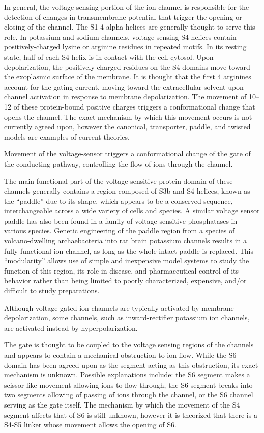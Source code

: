 In general, the voltage sensing portion of the ion channel is responsible for the detection of changes in transmembrane potential that trigger the opening or closing of the channel. The S1-4 alpha helices are generally thought to serve this role. In potassium and sodium channels, voltage-sensing S4 helices contain positively-charged lysine or arginine residues in repeated motifs. In its resting state, half of each S4 helix is in contact with the cell cytosol. Upon depolarization, the positively-charged residues on the S4 domains move toward the exoplasmic surface of the membrane. It is thought that the first 4 arginines account for the gating current, moving toward the extracellular solvent upon channel activation in response to membrane depolarization. The movement of 10--12 of these protein-bound positive charges triggers a conformational change that opens the channel. The exact mechanism by which this movement occurs is not currently agreed upon, however the canonical, transporter, paddle, and twisted models are examples of current theories.

Movement of the voltage-sensor triggers a conformational change of the gate of the conducting pathway, controlling the flow of ions through the channel.

The main functional part of the voltage-sensitive protein domain of these channels generally contains a region composed of S3b and S4 helices, known as the ``paddle'' due to its shape, which appears to be a conserved sequence, interchangeable across a wide variety of cells and species. A similar voltage sensor paddle has also been found in a family of voltage sensitive phosphatases in various species. Genetic engineering of the paddle region from a species of volcano-dwelling archaebacteria into rat brain potassium channels results in a fully functional ion channel, as long as the whole intact paddle is replaced. This ``modularity'' allows use of simple and inexpensive model systems to study the function of this region, its role in disease, and pharmaceutical control of its behavior rather than being limited to poorly characterized, expensive, and/or difficult to study preparations.

Although voltage-gated ion channels are typically activated by membrane depolarization, some channels, such as inward-rectifier potassium ion channels, are activated instead by hyperpolarization.

The gate is thought to be coupled to the voltage sensing regions of the channels and appears to contain a mechanical obstruction to ion flow. While the S6 domain has been agreed upon as the segment acting as this obstruction, its exact mechanism is unknown. Possible explanations include: the S6 segment makes a scissor-like movement allowing ions to flow through, the S6 segment breaks into two segments allowing of passing of ions through the channel, or the S6 channel serving as the gate itself. The mechanism by which the movement of the S4 segment affects that of S6 is still unknown, however it is theorized that there is a S4-S5 linker whose movement allows the opening of S6.

